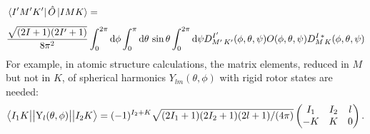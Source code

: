 \begin{alignat}{2}
&\left< I^{\prime}M^{\prime}K^{\prime} \right|\hat{O}\left|IMK\right>=\\[4pt]
&
\frac{\sqrt{(2I+1)(2I^{\prime}+1)}}{8\pi^2}
\int_0^{2\pi}\text{d}\phi \int_0^{\pi}\text{d}\theta\,\sin\theta \int_0^{2\pi}\text{d}\psi
D^{I^{\prime}}_{M^{\prime}\,K^{\prime}}(\phi,\theta,\psi)O(\phi,\theta,\psi) D^{I\,*}_{M\,K}(\phi,\theta,\psi)\notag
\end{alignat}
For example, in atomic structure calculations, the matrix elements, reduced in $M$ but not in $K$, of spherical harmonics $Y_{lm}(\theta,\phi)$ with rigid rotor states are needed:
\begin{align}
\label{eq:rigidRotRedElement} 
\left< I_1K\big{|}\big{|}\text{Y}_l(\theta,\phi)\big{|}\big{|}I_2K\right>=(-1)^{I_2+K}
\sqrt{(2I_1+1)(2I_2+1)(2l+1)/(4\pi)}
\left(
\begin{matrix}
I_1&I_2&l\\
-K&K&0
\end{matrix}
\right).
\end{align}







